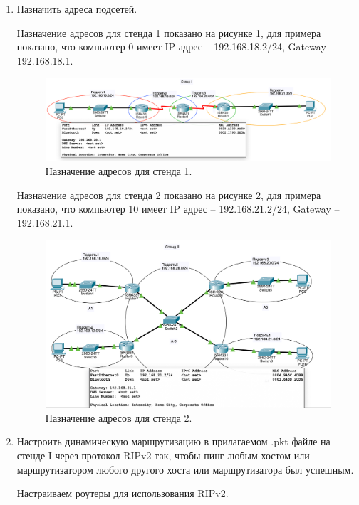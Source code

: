 \documentclass[a4paper,14pt]{extreport} %
\begin{document}
\begin{enumerate}

\item Назначить адреса подсетей.

Назначение адресов для стенда 1 показано на рисунке 1, для примера показано, что компьютер 0 имеет IP адрес -- 192.168.18.2/24, Gateway -- 192.168.18.1.

\begin{figure}[H]
  \centering
  \includegraphics[scale=0.56]{1}
  \caption{Назначение адресов для стенда 1. }
\end{figure}

Назначение адресов для стенда 2 показано на рисунке 2, для примера показано, что компьютер 10 имеет IP адрес -- 192.168.21.2/24, Gateway -- 192.168.21.1.

\begin{figure}[H]
  \centering
  \includegraphics[scale=0.6]{2}
  \caption{Назначение адресов для стенда 2. }
\end{figure}

\item Настроить динамическую маршрутизацию в прилагаемом .pkt файле на стенде I через протокол RIPv2 так, чтобы пинг любым хостом или маршрутизатором любого другого хоста или маршрутизатора был успешным.

Настраиваем роутеры для использования RIPv2. 
 

\end{enumerate}
\end{document}
